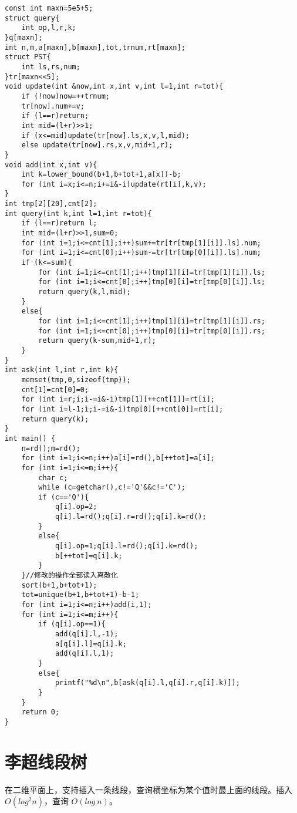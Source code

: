 \documentclass[12pt]{article}
\begin{document}
{{{{{{{{{{{{\setmainfont{Consolas}
\begin{lstlisting}
const int maxn=5e5+5;
struct query{
    int op,l,r,k;
}q[maxn];
int n,m,a[maxn],b[maxn],tot,trnum,rt[maxn];
struct PST{
    int ls,rs,num;
}tr[maxn<<5];
void update(int &now,int x,int v,int l=1,int r=tot){
    if (!now)now=++trnum;
    tr[now].num+=v;
    if (l==r)return;
    int mid=(l+r)>>1;
    if (x<=mid)update(tr[now].ls,x,v,l,mid);
    else update(tr[now].rs,x,v,mid+1,r);
}
void add(int x,int v){
    int k=lower_bound(b+1,b+tot+1,a[x])-b;
    for (int i=x;i<=n;i+=i&-i)update(rt[i],k,v);
}
int tmp[2][20],cnt[2];
int query(int k,int l=1,int r=tot){
    if (l==r)return l;
    int mid=(l+r)>>1,sum=0;
    for (int i=1;i<=cnt[1];i++)sum+=tr[tr[tmp[1][i]].ls].num;
    for (int i=1;i<=cnt[0];i++)sum-=tr[tr[tmp[0][i]].ls].num;
    if (k<=sum){
        for (int i=1;i<=cnt[1];i++)tmp[1][i]=tr[tmp[1][i]].ls;
        for (int i=1;i<=cnt[0];i++)tmp[0][i]=tr[tmp[0][i]].ls;
        return query(k,l,mid);
    } 
    else{
        for (int i=1;i<=cnt[1];i++)tmp[1][i]=tr[tmp[1][i]].rs;
        for (int i=1;i<=cnt[0];i++)tmp[0][i]=tr[tmp[0][i]].rs;
        return query(k-sum,mid+1,r);
    }
}
int ask(int l,int r,int k){
    memset(tmp,0,sizeof(tmp));
    cnt[1]=cnt[0]=0;
    for (int i=r;i;i-=i&-i)tmp[1][++cnt[1]]=rt[i];
    for (int i=l-1;i;i-=i&-i)tmp[0][++cnt[0]]=rt[i];
    return query(k);
}
int main() {
    n=rd();m=rd();
    for (int i=1;i<=n;i++)a[i]=rd(),b[++tot]=a[i];
    for (int i=1;i<=m;i++){
        char c;
        while (c=getchar(),c!='Q'&&c!='C');
        if (c=='Q'){
            q[i].op=2;
            q[i].l=rd();q[i].r=rd();q[i].k=rd();
        }
        else{
            q[i].op=1;q[i].l=rd();q[i].k=rd();
            b[++tot]=q[i].k;
        }
    }//修改的操作全部读入离散化
    sort(b+1,b+tot+1);
    tot=unique(b+1,b+tot+1)-b-1;
    for (int i=1;i<=n;i++)add(i,1);
    for (int i=1;i<=m;i++){
        if (q[i].op==1){
            add(q[i].l,-1);
            a[q[i].l]=q[i].k;
            add(q[i].l,1);
        }
        else{
            printf("%d\n",b[ask(q[i].l,q[i].r,q[i].k)]);
        }
    }
    return 0;
}
\end{lstlisting}



\section{李超线段树}

在二维平面上，支持插入一条线段，查询横坐标为某个值时最上面的线段。插入$O(log^2n)$，查询 $O(log\ n)$。

}}}}}}}}}}}}
\end{document}
